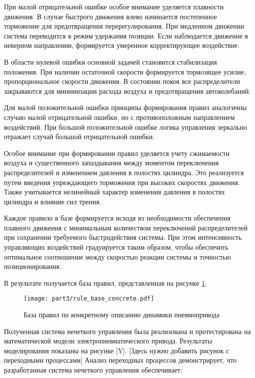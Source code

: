 При малой отрицательной ошибке особое внимание уделяется
плавности движения. В случае быстрого движения влево начинается
постепенное торможение для предотвращения перерегулирования.
При медленном движении система переводится в режим удержания
позиции. Если наблюдается движение в неверном направлении,
формируется умеренное корректирующее воздействие.

В области нулевой ошибки основной задачей становится стабилизация
положения. При наличии остаточной скорости формируется тормозящее
усилие, пропорциональное скорости движения. В состоянии покоя все
распределители закрываются для минимизации расхода воздуха и
предотвращения автоколебаний.

Для малой положительной ошибки принципы формирования правил
аналогичны случаю малой отрицательной ошибки, но с противоположным
направлением воздействий. При большой положительной ошибке
логика управления зеркально отражает случай большой отрицательной ошибки.

Особое внимание при формировании правил уделяется учету сжимаемости
воздуха и существенного запаздывания между моментом переключения
распределителей и изменением давления в полостях цилиндра. Это
реализуется путем введения упреждающего торможения при высоких
скоростях движения. Также учитывается нелинейный характер изменения
давления в полостях цилиндра и влияние сил трения.

Каждое правило в базе формируется исходя из необходимости
обеспечения плавного движения с минимальным количеством
переключений распределителей при сохранении требуемого
быстродействия системы. При этом интенсивность управляющих
воздействий градуируется таким образом, чтобы обеспечить
оптимальное соотношение между скоростью реакции системы и
точностью позиционирования.

В результате получается база правил, представленная на рисунке \ref{fig:concrette_fuzzy_rules}.

\begin{figure}[ht]
	\centering
	\texttt{[image: part3/rule\_base\_concrete.pdf]}
	\caption{База правил по конкретному описанию динамики пневмопривода}
	\label{fig:concrette_fuzzy_rules}
\end{figure}

Полученная система нечеткого управления была реализована и протестирована на математической модели электропневматического привода. Результаты моделирования показаны на рисунке [Y].
[Здесь нужно добавить рисунок с переходными процессами]
Анализ переходных процессов демонстрирует, что разработанная система нечеткого управления обеспечивает:

